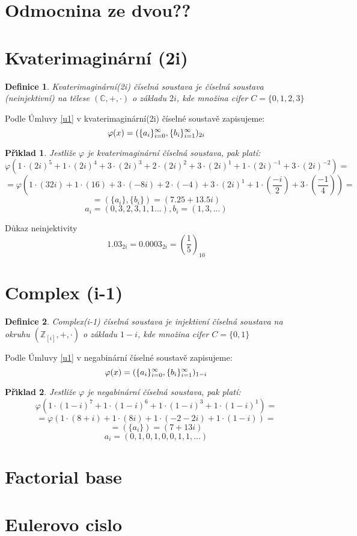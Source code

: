 \documentclass[12pt]{book}
\newtheorem{definice}{Definice}
\newtheorem{pr}{P\v r\'\i klad}
\begin{document}
\section{Odmocnina ze dvou??}

\newpage

\section{Kvaterimaginární (2i)}

\begin{definice}
	Kvaterimaginární(2i) číselná soustava je číselná soustava (neinjektivní) na tělese $(\mathbb{C},+,\cdot)$ o základu $2i$, kde množina cifer $C = \{0,1,2,3\}$
\end{definice}

Podle Úmluvy \ref{u1} v kvaterimaginární(2i) číselné soustavě zapisujeme:
$$\varphi(x) = (\{a_i\}_{i=0}^{\infty},\{b_i\}_{i=1}^{\infty})_{2i}$$


\begin{pr}
	Jestliže $\varphi$ je kvaterimaginární číselná soustava, pak platí:
	$$\varphi(1\cdot(2i)^5+1\cdot(2i)^4+3\cdot(2i)^3+2\cdot(2i)^2+3\cdot(2i)^1+1\cdot(2i)^{-1}+3\cdot(2i)^{-2})=$$
	$$=\varphi(1\cdot(32i)+1\cdot(16)+3\cdot(-8i)+2\cdot(-4)+3\cdot(2i)^1+1\cdot(\frac{-i}{2})+3\cdot(\frac{-1}{4}))=$$
	$$=(\{a_i\},\{b_i\})=(7.25+13.5i)$$
	$${a_i}=(0,3,2,3,1,1...),{b_i}=(1,3,...) $$
\end{pr}

Důkaz neinjektivity
$$1.03_{2i} = 0.0003_{2i} = \left(\frac{1}{5}\right)_{10}$$

\newpage

\section{Complex (i-1)}

\begin{definice}
	Complex(i-1) číselná soustava je injektivní číselná soustava na okruhu $(\mathbb{Z}_{[i]},+,\cdot)$ o základu $1-i$, kde množina cifer $C = \{0,1\}$
\end{definice}

Podle Úmluvy \ref{u1} v negabinární číselné soustavě zapisujeme:
$$\varphi(x) = (\{a_i\}_{i=0}^{\infty},\{b_i\}_{i=1}^{\infty})_{1-i}$$


\begin{pr}
	Jestliže $\varphi$ je negabinární číselná soustava, pak platí:
	$$\varphi(1\cdot(1-i)^7+1\cdot(1-i)^6+1\cdot(1-i)^3+1\cdot(1-i)^1)=$$
	$$=\varphi(1\cdot(8+i)+1\cdot(8i)+1\cdot(-2-2i)+1\cdot(1-i))=$$
	$$=(\{a_i\})=(7+13i)$$
	$${a_i}=(0,1,0,1,0,0,1,1,...) $$
\end{pr}

\newpage

\section{Factorial base}

\newpage

\section{Eulerovo cislo}
\end{document}
